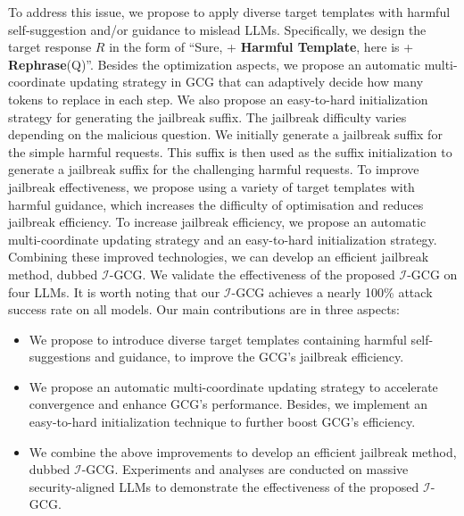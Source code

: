 \par To address this issue, we propose to apply diverse target templates with harmful self-suggestion and/or guidance to mislead LLMs. Specifically, we design the target response $R$ in the form of ``Sure, + \textbf{Harmful Template}, here is + \textbf{Rephrase}(Q)''. Besides the optimization aspects, we propose an automatic multi-coordinate updating strategy in GCG that can adaptively decide how many tokens to replace in each step. We also propose  an easy-to-hard initialization strategy for generating the jailbreak suffix. The jailbreak difficulty varies depending on the malicious question.
We initially generate a jailbreak suffix for the simple harmful requests. This suffix is then used as the suffix initialization to generate a jailbreak suffix for the challenging harmful requests.
To improve jailbreak effectiveness, we propose using a variety of target templates with harmful guidance, which increases the difficulty of optimisation and reduces jailbreak efficiency. To increase jailbreak efficiency, we propose an automatic multi-coordinate updating strategy and an easy-to-hard initialization strategy. Combining these improved technologies, we can develop an efficient jailbreak method, dubbed $\mathcal{I}$-GCG. We validate the effectiveness of the proposed $\mathcal{I}$-GCG on four LLMs. It is worth noting that our $\mathcal{I}$-GCG achieves a nearly 100\% attack success rate on all models. Our main contributions are in three aspects:
\begin{itemize}[leftmargin=0.5cm]
  \item We propose to introduce diverse target templates containing harmful self-suggestions and guidance, to improve the  GCG's jailbreak efficiency. 
  \item  We propose an automatic multi-coordinate updating strategy to accelerate convergence and enhance GCG's performance. Besides, we implement an easy-to-hard initialization technique to further boost GCG's efficiency. 
  \item We combine the above improvements to develop an efficient jailbreak method, dubbed $\mathcal{I}$-GCG. Experiments and analyses are conducted on massive security-aligned LLMs to demonstrate the effectiveness of the proposed $\mathcal{I}$-GCG. 
\end{itemize}


